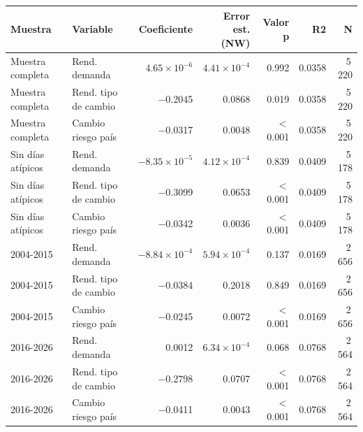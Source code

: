 \begin{tabularx}{\linewidth}{l>{\raggedright\arraybackslash}Xrrrrr}
\toprule
Muestra & Variable & Coeficiente & \makecell[r]{Error est.\\(NW)} & Valor p & R2 & N \\
\midrule
Muestra completa & Rend. demanda & $4.65\times10^{-6}$ & $4.41\times10^{-4}$ & 0.992 & 0.0358 & 5\,220 \\
Muestra completa & Rend. tipo de cambio & $-$0.2045 & 0.0868 & 0.019 & 0.0358 & 5\,220 \\
Muestra completa & Cambio riesgo país & $-$0.0317 & 0.0048 & $<$0.001 & 0.0358 & 5\,220 \\
Sin días atípicos & Rend. demanda & $-8.35\times10^{-5}$ & $4.12\times10^{-4}$ & 0.839 & 0.0409 & 5\,178 \\
Sin días atípicos & Rend. tipo de cambio & $-$0.3099 & 0.0653 & $<$0.001 & 0.0409 & 5\,178 \\
Sin días atípicos & Cambio riesgo país & $-$0.0342 & 0.0036 & $<$0.001 & 0.0409 & 5\,178 \\
2004-2015 & Rend. demanda & $-8.84\times10^{-4}$ & $5.94\times10^{-4}$ & 0.137 & 0.0169 & 2\,656 \\
2004-2015 & Rend. tipo de cambio & $-$0.0384 & 0.2018 & 0.849 & 0.0169 & 2\,656 \\
2004-2015 & Cambio riesgo país & $-$0.0245 & 0.0072 & $<$0.001 & 0.0169 & 2\,656 \\
2016-2026 & Rend. demanda & 0.0012 & $6.34\times10^{-4}$ & 0.068 & 0.0768 & 2\,564 \\
2016-2026 & Rend. tipo de cambio & $-$0.2798 & 0.0707 & $<$0.001 & 0.0768 & 2\,564 \\
2016-2026 & Cambio riesgo país & $-$0.0411 & 0.0043 & $<$0.001 & 0.0768 & 2\,564 \\
\bottomrule
\end{tabularx}
